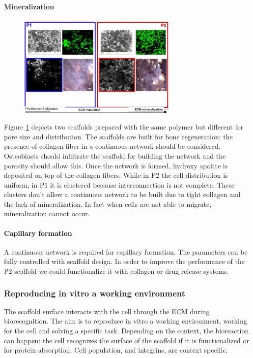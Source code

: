 			\paragraph{Mineralization}

			\begin{figure}[h]
				\centering
				\includegraphics[width=0.7\textwidth]{mineralization}
				\caption{\label{fig:min}}
			\end{figure}

			Figure \ref{fig:min} depicts two scaffolds prepared with the same polymer but different for pore size and distribution.
			The scaffolds are built for bone regeneration: the presence of collagen fiber in a continuous network should be considered.
			Osteoblasts should infiltrate the scaffold for building the network and the porosity should allow this.
			Once the network is formed, hydroxy apatite is deposited on top of the collagen fibers.
			While in P2 the cell distribution is uniform, in P1 it is clustered because interconnection is not complete.
			These clusters don't allow a continuous network to be built due to tight collagen and the lack of mineralization.
			In fact when cells are not able to migrate, mineralization cannot occur.

			\paragraph{Capillary formation}
			A continuous network is required for capillary formation.
			The parameters can be fully controlled with scaffold design.
			In order to improve the performance of the P2 scaffold we could functionalize it with collagen or drug release systems.

		\subsubsection{Reproducing in vitro a working environment}
		The scaffold surface interacts with the cell through the ECM during biorecognition.
		The aim is to reproduce in vitro a working environment, working for the cell and solving a specific task.
		Depending on the context, the bioreaction can happen: the cell recognizes the surface of the scaffold if it is functionalized or for protein absorption.
		Cell population, and integrins, are context specific.

